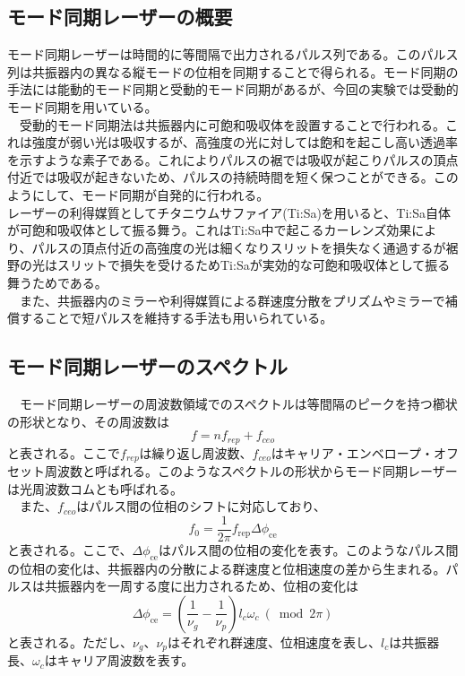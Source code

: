 \documentclass[uplatex,dvipdfmx,a4paper,report,papersize,11pt]{jsbook}
\begin{document}
\subsection{モード同期レーザーの概要}
モード同期レーザーは時間的に等間隔で出力されるパルス列である。このパルス列は共振器内の異なる縦モードの位相を同期することで得られる。モード同期の手法には能動的モード同期と受動的モード同期があるが、今回の実験では受動的モード同期を用いている。\\
　受動的モード同期法は共振器内に可飽和吸収体を設置することで行われる。これは強度が弱い光は吸収するが、高強度の光に対しては飽和を起こし高い透過率を示すような素子である。これによりパルスの裾では吸収が起こりパルスの頂点付近では吸収が起きないため、パルスの持続時間を短く保つことができる。このようにして、モード同期が自発的に行われる。\\
 レーザーの利得媒質としてチタニウムサファイア(Ti:Sa)を用いると、Ti:Sa自体が可飽和吸収体として振る舞う。これはTi:Sa中で起こるカーレンズ効果により、パルスの頂点付近の高強度の光は細くなりスリットを損失なく通過するが裾野の光はスリットで損失を受けるためTi:Saが実効的な可飽和吸収体として振る舞うためである。\\
　また、共振器内のミラーや利得媒質による群速度分散をプリズムやミラーで補償することで短パルスを維持する手法も用いられている。
\subsection{モード同期レーザーのスペクトル}
　モード同期レーザーの周波数領域でのスペクトルは等間隔のピークを持つ櫛状の形状となり、その周波数は
\begin{equation}
  f = nf_{rep} + f_{ceo}
\end{equation}
と表される\cite{Colloquium:Femtosecondopticalfrequencycombs}。ここで$f_{rep}$は繰り返し周波数、$f_{ceo}$はキャリア・エンベロープ・オフセット周波数と呼ばれる。このようなスペクトルの形状からモード同期レーザーは光周波数コムとも呼ばれる。\\
　また、$f_{ceo}$はパルス間の位相のシフトに対応しており、
 \begin{equation}
   f _ { 0 } = \frac { 1 } { 2 \pi } f _ { \mathrm { rep } } \Delta \phi _ { \mathrm { ce } }
 \end{equation}
と表される\cite{Colloquium:Femtosecondopticalfrequencycombs}。ここで、$\Delta \phi _ { \mathrm { ce } }$はパルス間の位相の変化を表す。このようなパルス間の位相の変化は、共振器内の分散による群速度と位相速度の差から生まれる。パルスは共振器内を一周する度に出力されるため、位相の変化は
\begin{equation}
  \Delta \phi _ { \mathrm { ce } } = \left( \frac { 1 } { \nu _ { g } } - \frac { 1 } { \nu _ { p } } \right) l _ { c } \omega _ { c }\ (\bmod 2 \pi)
\end{equation}
と表される\cite{Colloquium:Femtosecondopticalfrequencycombs}。ただし、$\nu _ { g }$、$\nu _ { p }$はそれぞれ群速度、位相速度を表し、$l_c$は共振器長、$\omega_c$はキャリア周波数を表す。
\end{document}
